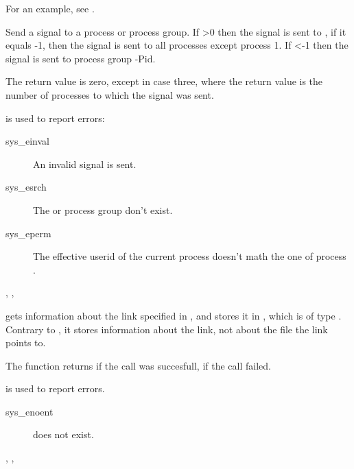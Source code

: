 For an example, see .

{ Send a signal  to a process or process group. If >0 then
the signal is sent to , if it equals -1, then the signal is sent to
all processes except process 1. If <-1 then the signal is sent to
process group -Pid.

The return value is zero, except in case three, where the return value is the
number of processes to which the signal was sent.
}
{ is used to report errors:
\begin{description}
\item[sys\_einval] An invalid signal is sent.
\item[sys\_esrch] The  or process group don't exist.
\item[sys\_eperm] The effective userid of the current process doesn't math
the one of process .
\end{description}
}
{, ,  }

{
 gets information about the link specified in , and stores it in 
, which is of type . Contrary to , it stores
information about the link, not about the file the link points to.

The function returns  if the call was succesfull,  if the call
failed.
}
{  is used to report errors.
\begin{description}
\item[sys\_enoent]  does not exist.
\end{description}
}
{, , }



